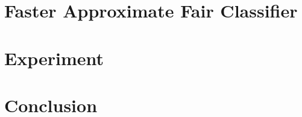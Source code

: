 \documentclass{article}
\begin{document}
\section{Faster Approximate Fair Classifier}

\section{Experiment}

\section{Conclusion}



\end{document}
